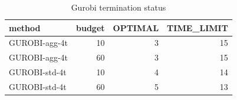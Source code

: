 \begin{table}[htbp]
\centering
\small
\caption{Gurobi termination status}
\label{tab:E7_gurobi_threads_gurobi_status}
\begin{tabular}{lrrr}
\toprule
method & budget & OPTIMAL & TIME\_LIMIT \\
\midrule
GUROBI-agg-4t & 10 & 3 & 15 \\
GUROBI-agg-4t & 60 & 3 & 15 \\
GUROBI-std-4t & 10 & 4 & 14 \\
GUROBI-std-4t & 60 & 5 & 13 \\
\bottomrule
\end{tabular}
\end{table}
